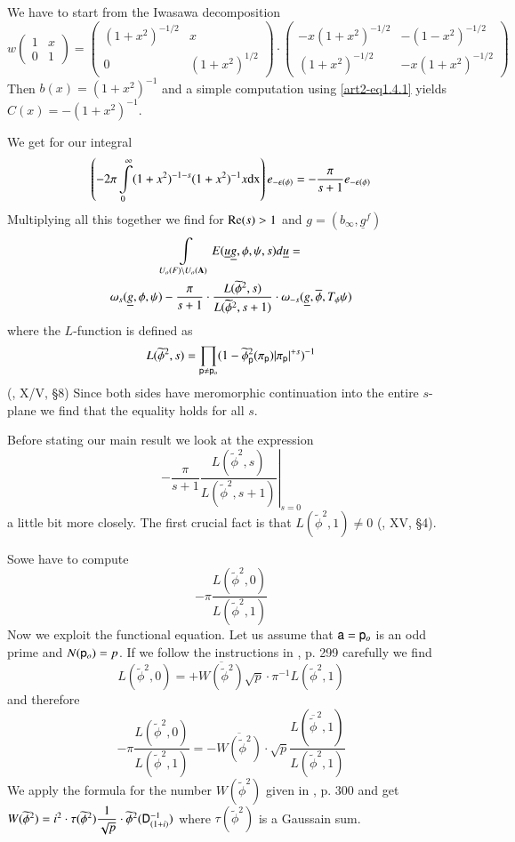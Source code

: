 We have to start from the Iwasawa decomposition
$$
w
\left(
\begin{matrix}
1 & x\\
0 & 1
\end{matrix}
\right)
=
\left(
\begin{matrix}
(1+x^{2})^{-1/2} & x\\
0 & (1+x^{2})^{1/2}
\end{matrix}
\right)
\cdot
\left(
\begin{matrix}
-x(1+x^{2})^{-1/2} &-(1-x^{2})^{-1/2}\\
(1+x^{2})^{-1/2} & -x(1+x^{2})^{-1/2}
\end{matrix}
\right)
$$
Then $b(x)=(1+x^{2})^{-1}$ and a simple computation using \eqref{art2-eq1.4.1} yields $C(x)=-(1+x^{2})^{-1}$.

We get for our integral
$$
\left(-2\pi \int\limits^{\infty}_{0}(1+x^{2})^{-1-s}(1+x^{2})^{-1}x\mathrm{dx}\right)e_{-\epsilon(\phi)}=-\frac{\pi}{s+1}e_{-\epsilon(\phi)}
$$
Multiplying all this together we find for $\mathrm{Re}(s)>1$ and $g=(b_{\infty},\underline{g}^{f})$
\begin{gather*}
\int\limits_{U_{o}(F)\backslash U_{o}(\mathbf{A})}E(\underline{u}\underline{g},\phi,\psi,s)d\underline{u}=\\
\omega_{s}(\underline{g},\phi,\psi)-\frac{\pi}{s+1}\cdot \frac{L(\widetilde{\phi}^{2},s)}{L(\widetilde{\phi}^{2},s+1)}\cdot \omega_{-s}(\underline{g},\overline{\phi},T_{\phi}\psi)
\end{gather*}
where the $L$-function is defined as
$$
L(\widetilde{\phi}^{2},s)=\prod\limits_{\mathsf{p}\neq \mathsf{p}_{o}}(1-\widetilde{\phi}^{2}_{\mathsf{p}}(\pi_{\mathsf{p}})|\pi_{\mathsf{p}}|^{+s})^{-1}
$$
(\cite{art2-key12}, X/V, \S8) Since both sides have meromorphic continuation into the entire $s$-plane we find that the equality holds for all $s$.

Before stating our main result we look at the expression
$$
\left.-\frac{\pi}{s+1}\frac{L(\widetilde{\phi}^{2},s)}{L(\widetilde{\phi}^{2},s+1)}\right|_{s=0}
$$
a little bit more closely. The first crucial fact is that $L(\widetilde{\phi}^{2},1)\neq 0$ (\cite{art2-key12}, XV, \S4).

So\pageoriginale we have to compute
$$
-\pi\frac{L(\widetilde{\phi}^{2},0)}{L(\widetilde{\phi}^{2},1)}
$$
Now we exploit the functional equation. Let us assume that $\mathsf{a}=\mathsf{p}_{o}$ is an odd prime and $N(\mathsf{p}_{o})=p$. If we follow the instructions in \cite{art2-key12}, p. 299 carefully we find
$$
L(\widetilde{\phi}^{2},0)=+\overline{W(\widetilde{\phi}^{2})}\sqrt{p}\cdot \pi^{-1}L(\widetilde{\phi}^{2},1)
$$
and therefore
$$
-\pi \frac{L(\widetilde{\phi}^{2},0)}{L(\widetilde{\phi}^{2},1)}=-\overline{W(\widetilde{\phi}^{2})}\cdot \sqrt{p}\frac{L(\overline{\widetilde{\phi}}^{2},1)}{L(\widetilde{\phi}^{2},1)}
$$
We apply the formula for the number $W(\widetilde{\phi}^{2})$ given in \cite{art2-key12}, p. 300 and get $W(\widetilde{\phi}^{2})=i^{2}\cdot \tau(\widetilde{\phi}^{2})\dfrac{1}{\sqrt{p}}\cdot \widetilde{\phi}^{2}(\mathsf{D}^{-1}_{(1+i)})$ where $\tau(\widetilde{\phi}^{2})$ is a Gaussain sum.

